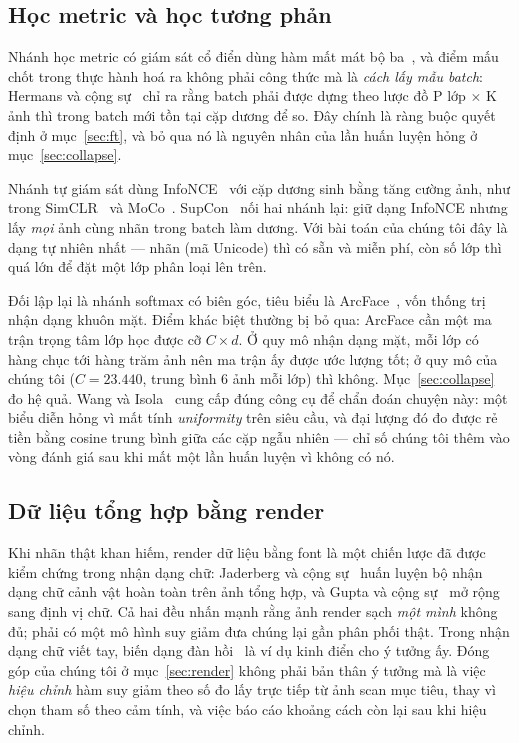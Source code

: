 \documentclass[conference,a4paper]{IEEEtran}
\begin{document}
\subsection{Học metric và học tương phản}

Nhánh học metric có giám sát cổ điển dùng hàm mất mát bộ ba~\cite{facenet}, và điểm mấu chốt trong
thực hành hoá ra không phải công thức mà là \emph{cách lấy mẫu batch}:
Hermans và cộng sự~\cite{intriplet} chỉ ra rằng batch phải được dựng theo lược đồ P lớp $\times$ K
ảnh thì trong batch mới tồn tại cặp dương để so. Đây chính là ràng buộc quyết định ở
mục~\ref{sec:ft}, và bỏ qua nó là nguyên nhân của lần huấn luyện hỏng ở mục~\ref{sec:collapse}.

Nhánh tự giám sát dùng InfoNCE~\cite{infonce} với cặp dương sinh bằng tăng cường ảnh, như trong
SimCLR~\cite{simclr} và MoCo~\cite{moco}. SupCon~\cite{supcon} nối hai nhánh lại: giữ dạng InfoNCE
nhưng lấy \emph{mọi} ảnh cùng nhãn trong batch làm dương. Với bài toán của chúng tôi đây là dạng tự
nhiên nhất --- nhãn (mã Unicode) thì có sẵn và miễn phí, còn số lớp thì quá lớn để đặt một lớp phân
loại lên trên.

Đối lập lại là nhánh softmax có biên góc, tiêu biểu là ArcFace~\cite{arcface}, vốn thống trị nhận
dạng khuôn mặt. Điểm khác biệt thường bị bỏ qua: ArcFace cần một ma trận trọng tâm lớp học được cỡ
$C \times d$. Ở quy mô nhận dạng mặt, mỗi lớp có hàng chục tới hàng trăm ảnh nên ma trận ấy được ước
lượng tốt; ở quy mô của chúng tôi ($C = 23.440$, trung bình 6 ảnh mỗi lớp) thì không.
Mục~\ref{sec:collapse} đo hệ quả. Wang và Isola~\cite{alignuniform} cung cấp đúng công cụ để chẩn
đoán chuyện này: một biểu diễn hỏng vì mất tính \emph{uniformity} trên siêu cầu, và đại lượng đó đo
được rẻ tiền bằng cosine trung bình giữa các cặp ngẫu nhiên --- chỉ số chúng tôi thêm vào vòng đánh
giá sau khi mất một lần huấn luyện vì không có nó.

\subsection{Dữ liệu tổng hợp bằng render}

Khi nhãn thật khan hiếm, render dữ liệu bằng font là một chiến lược đã được kiểm chứng trong nhận
dạng chữ: Jaderberg và cộng sự~\cite{synth90k} huấn luyện bộ nhận dạng chữ cảnh vật hoàn toàn trên
ảnh tổng hợp, và Gupta và cộng sự~\cite{synthtext} mở rộng sang định vị chữ. Cả hai đều nhấn mạnh
rằng ảnh render sạch \emph{một mình} không đủ; phải có một mô hình suy giảm đưa chúng lại gần phân
phối thật. Trong nhận dạng chữ viết tay, biến dạng đàn hồi~\cite{elastic} là ví dụ kinh điển cho ý
tưởng ấy. Đóng góp của chúng tôi ở mục~\ref{sec:render} không phải bản thân ý tưởng mà là việc
\emph{hiệu chỉnh} hàm suy giảm theo số đo lấy trực tiếp từ ảnh scan mục tiêu, thay vì chọn tham số
theo cảm tính, và việc báo cáo khoảng cách còn lại sau khi hiệu chỉnh.
\end{document}
